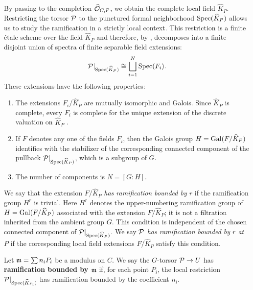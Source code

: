 By passing to the completion $\widehat{\mathcal{O}}_{C,P}$, we obtain the complete local field $\widehat{K}_P$.
Restricting the torsor $\mathcal{P}$ to the punctured formal neighborhood $\operatorname{Spec}(\widehat{K}_P)$
allows us to study the ramification in a strictly local context.
This restriction is a finite \'etale scheme over the field $\widehat{K}_P$ and therefore, by
, decomposes into a finite disjoint union of spectra of finite separable field extensions:
\[
    \mathcal{P}|_{\operatorname{Spec}(\widehat{K}_P)} \cong \bigsqcup_{i=1}^N \operatorname{Spec}(F_i).
\]
These extensions have the following properties:
\begin{enumerate}
    \item The extensions $F_i/\widehat{K}_P$ are mutually isomorphic and Galois. Since
    $\widehat{K}_P$ is complete, every $F_i$ is complete for the unique extension of the discrete valuation on
    $\widehat{K}_P$ \cite[Chapter~II, \S 2, Proposition~3]{serreLF}.
    \item If $F$ denotes any one of the fields $F_i$, then the Galois group
    $H = \operatorname{Gal}(F/\widehat{K}_P)$ identifies with the stabilizer of the corresponding connected component of the pullback $\mathcal{P}|_{\operatorname{Spec}(\widehat{K}_P)}$,
     which is a subgroup of $G$.
    \item The number of components is $N=[G:H]$.
\end{enumerate}

\begin{definition}\label{definition:local_ramification_boundness}
    We say that the extension $F/\widehat{K}_P$ \textit{has ramification bounded by $r$} if the ramification group $H^r$ is trivial.
    Here $H^r$ denotes the upper-numbering ramification group of
    $H=\operatorname{Gal}(F/\widehat{K}_P)$ associated with the extension $F/\widehat{K}_P$; it is not a filtration inherited from the ambient group $G$.
    This condition is independent of the chosen connected component of
    $\mathcal{P}|_{\operatorname{Spec}(\widehat{K}_P)}$.
    We say \textit{$\mathcal{P}$ has ramification bounded by $r$ at $P$} if the corresponding local field extensions $F/\widehat{K}_P$
    satisfy this condition.
\end{definition}


\begin{definition}\label{definition:ramification_bounded_by_modulus_closed_points}
    Let $\mathfrak{m} = \sum n_i P_i$ be a modulus on $C$. We say the $G$-torsor $\mathcal{P} \to U$ has
    \textbf{ramification bounded by $\mathfrak{m}$} if, for each point $P_i$, the local restriction
    $\mathcal{P}|_{\operatorname{Spec}(\widehat{K}_{P_i})}$ has ramification bounded by the coefficient $n_i$.
\end{definition}

